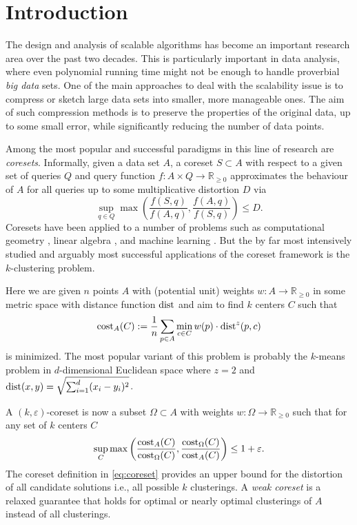 \section{Introduction}

The design and analysis of scalable algorithms has become an important research area over the past two decades. This is particularly important in data analysis, where even polynomial running time might not be enough to handle proverbial \emph{big data} sets.
One of the main approaches to deal with the scalability issue is to compress or sketch large data sets into smaller, more manageable ones. The aim of such compression methods is to preserve the properties of the original data, up to some small error, while significantly reducing the number of data points.

Among the most popular and successful paradigms in this line of research are \emph{coresets}. Informally, given a data set $A$, a coreset $S\subset A$ with respect to a given set of queries $Q$ and query function $f: A\times Q \rightarrow \mathbb{R}_{\geq 0}$ approximates the behaviour of $A$ for all queries up to some multiplicative distortion $D$ via
\begin{equation*}
    \sup_{q\in Q} \max\left( \frac{f(S,q)}{f(A,q)},\frac{f(A,q)}{f(S,q)}\right) \leq D.
\end{equation*}
Coresets have been applied to a number of problems such as computational geometry \cite{AHV05,Chan09}, linear algebra \cite{IndykMGR20,maalouf2019fast}, and machine learning \cite{MRM21,MunteanuSSW18}. But the by far most intensively studied and arguably most successful applications of the coreset framework is the $k$-clustering problem.

Here we are given $n$ points $A$ with (potential unit) weights $w:A\rightarrow \mathbb{R}_{\geq 0}$ in some metric space with distance function $\text{dist}$ and aim to find $k$ centers $C$ such that 
\begin{equation*}
\text{cost}_A(C):= \frac{1}{n} \sum_{p\in A}  \min_{c\in C} w(p)\cdot \text{dist}^z(p,c)
\end{equation*}
is minimized. The most popular variant of this problem is probably the $k$-means problem in $d$-dimensional Euclidean space where $z=2$ and $\text{dist}(x,y) = \sqrt{\sum_{i=1}^d (x_i-y_i)^2}$.

A $(k,\varepsilon)$-coreset is now a subset $\Omega\subset A$ with weights $w:\Omega\rightarrow \mathbb{R}_{\geq 0}$ such that for any set of $k$ centers $C$
\begin{equation}
\label{eq:coreset}
\sup_{C} \max\left( \frac{\text{cost}_A(C)}{\text{cost}_{\Omega}(C)},\frac{\text{cost}_{\Omega}(C)}{\text{cost}_{A}(C)}\right) \leq 1+\varepsilon.
\end{equation}
The coreset definition in \cref{eq:coreset} provides an upper bound for the distortion of all candidate solutions i.e., all possible $k$ clusterings. 
A \emph{weak coreset} is a relaxed guarantee that holds for optimal or nearly optimal clusterings of $A$ instead of all clusterings.

